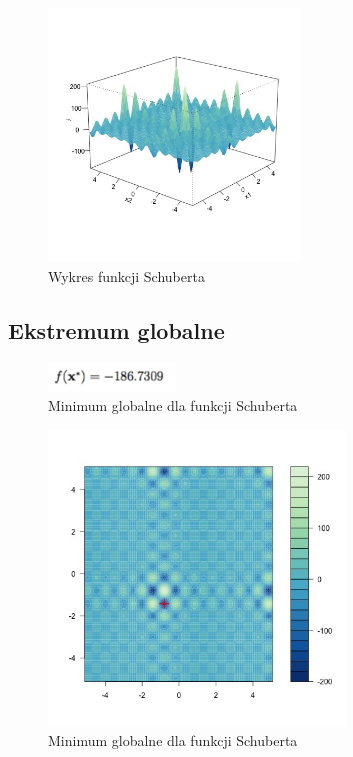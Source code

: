 \documentclass{article}
\begin{document}
    \begin{figure}[!h]
    \centering
    \includegraphics[width=0.6\textwidth]{inc/wykresyfunkcji/schubert}
     \caption{Wykres  funkcji Schuberta}
    \end{figure}
    
    \subsection{Ekstremum globalne}
    
       \begin{figure}[!h]
    \centering
    \includegraphics[width=0.3\textwidth]{inc/wzory/schubert-global-minimum}
     \caption{Minimum globalne dla funkcji Schuberta}
    \end{figure}
    
       \begin{figure}[!h]
    \centering
    \includegraphics[width=0.7\textwidth]{inc/wykresyfunkcji/schubert-global-minimum}
     \caption{Minimum globalne dla funkcji Schuberta}
    \end{figure}
    
\end{document}
